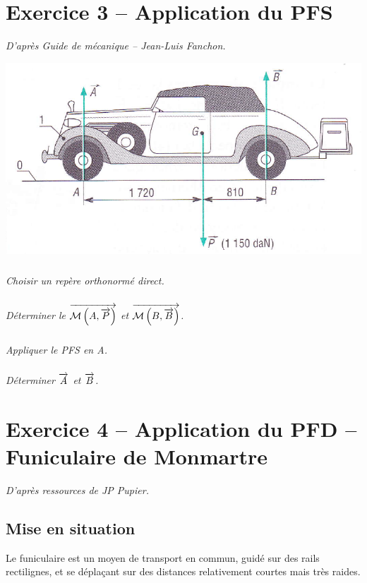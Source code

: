 \documentclass[10pt,fleqn]{book} %
\begin{document}
\begin{multicols}{2}
\section*{Exercice 3 -- Application du PFS}
\setcounter{subparagraph}{0}

\textit{D'après Guide de mécanique -- Jean-Luis Fanchon.}

\begin{center}
\includegraphics[width=\linewidth]{images/fig_05}
\end{center}

\subparagraph{}
\textit{Choisir un repère orthonormé direct.}


\subparagraph{}
\textit{Déterminer le $\overrightarrow{\mathcal{M}\left(A,\overrightarrow{P} \right)}$ et $\overrightarrow{\mathcal{M}\left(B,\overrightarrow{B} \right)}$.}


\subparagraph{}
\textit{Appliquer le PFS en A.}

\subparagraph{}
\textit{Déterminer $\overrightarrow{A}$ et $\overrightarrow{B}$.}

\section*{Exercice 4 -- Application du PFD -- Funiculaire de Monmartre}
\setcounter{subparagraph}{0}
\textit{D'après ressources de JP Pupier.}

\subsection*{Mise en situation}
Le funiculaire est un moyen de transport en commun, guidé sur des rails rectilignes, et se déplaçant sur des distances relativement courtes mais très raides. 


\end{multicols}
\end{document}
